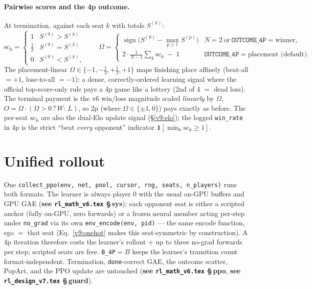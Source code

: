 \documentclass[11pt]{article}
\newcommand{\sign}{\operatorname{sign}}
\newcommand{\cd}[1]{\texttt{#1}}
\newcommand{\vsixref}[1]{\textbf{see \texttt{rl\_math\_v6.tex} \S\,#1}}
\newcommand{\vsevenref}[1]{\textbf{see \texttt{rl\_design\_v7.tex} \S\,#1}}
\begin{document}
\paragraph{Pairwise scores and the 4p outcome.} At termination, against each seat $k$ with totals
$S^{(k)}$:
\begin{equation}
\mathrm{sc}_k=\begin{cases}1 & S^{(0)}>S^{(k)}\\ \tfrac12 & S^{(0)}=S^{(k)}\\ 0 & S^{(0)}<S^{(k)},\end{cases}
\qquad
\Omega=\begin{cases}
\sign\!\big(S^{(0)}-\max_{p\ge1}S^{(p)}\big) & N{=}2\ \text{or}\ \cd{OUTCOME\_4P}{=}\text{winner},\\[4pt]
2\cdot\frac1{N-1}\sum_k \mathrm{sc}_k\;-\;1 & \cd{OUTCOME\_4P}{=}\text{placement (default)}.
\end{cases}
\label{v9:outcome}
\end{equation}
The placement-linear $\Omega\in\{-1,-\tfrac13,+\tfrac13,+1\}$ maps finishing place affinely
(beat-all $=+1$, lose-to-all $=-1$): a dense, correctly-ordered learning signal where the official
top-score-only rule pays a 4p game like a lottery (2nd of 4 $=$ dead loss). The terminal payment is
the v6 win/loss magnitude scaled \emph{linearly} by $\Omega$,
$O=\Omega\cdot(\Omega>0\,?\,W:\,L)$, so 2p (where $\Omega\in\{\pm1,0\}$) pays exactly as before.
The per-seat $\mathrm{sc}_k$ are also the dual-Elo update signal (\S\ref{v9:elo}); the logged
\cd{win\_rate} in 4p is the strict ``beat \emph{every} opponent'' indicator
$\mathbf{1}[\min_k\mathrm{sc}_k\ge 1]$.

\section{Unified rollout}\label{v9:rollout}
One \cd{collect\_ppo(env, net, pool, cursor, rng, seats, n\_players)} runs both formats. The
learner is always player 0 with the usual on-GPU buffers and GPU GAE (\vsixref{sys}); each opponent
seat is either a scripted anchor (fully on-GPU, zero forwards) or a frozen neural member acting
per-step under \cd{no\_grad} via its own \cd{env\_encode(env, pid)} --- the same encode function,
ego $=$ that seat (Eq.~\eqref{v9:onehot} makes this seat-symmetric by construction). A 4p iteration
therefore costs the learner's rollout $+$ up to three no-grad forwards per step; scripted seats are
free. \cd{B\_4P}$=B$ keeps the learner's transition count format-independent. Termination,
\cd{done}-correct GAE, the outcome scatter, PopArt, and the PPO update are untouched
(\vsixref{ppo}, \vsevenref{guard}).
\end{document}
